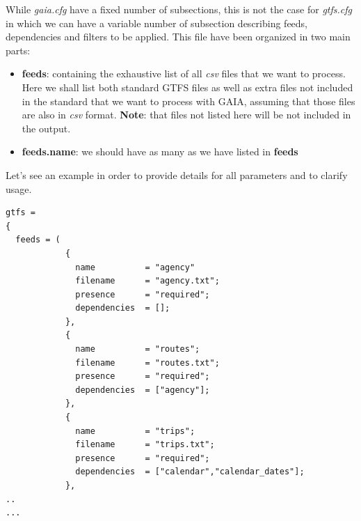 \documentclass[12pt, a4paper]{book}
\begin{document}
\begin{justify}
While \textit{gaia.cfg} have a fixed number of subsections, this is not the case for \textit{gtfs.cfg} in which we can have a variable number of subsection describing feeds, dependencies and filters to be applied.
This file have been organized in two main parts:
\begin{itemize}
\item \textbf{feeds}: containing the exhaustive list of all \textit{csv} files that we want to process. Here we shall list both standard GTFS files as well as extra files not included in the standard that we want to process with GAIA, assuming that those files are also in \textit{csv} format.\newline
\textbf{Note}: that files not listed here will be not included in the output.
\item \textbf{feeds.name}: we should have as many as we have listed in \textbf{feeds}
\end{itemize}
Let's see an example in order to provide details for all parameters and to clarify usage.
\end{justify}

\begin{small}
\begin{lstlisting}[backgroundcolor=\color{gray},frame=single]
gtfs =
{
  feeds = ( 
            { 
              name          = "agency"
              filename      = "agency.txt";
              presence      = "required";
              dependencies  = [];
            },
            { 
              name          = "routes";
              filename      = "routes.txt";
              presence      = "required";
              dependencies  = ["agency"];
            },
            { 
              name          = "trips";
              filename      = "trips.txt";
              presence      = "required";
              dependencies  = ["calendar","calendar_dates"];
            },
..
...           
\end{lstlisting}
\end{small}
\end{document}
